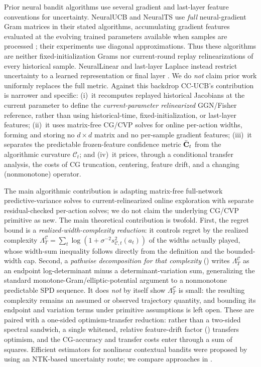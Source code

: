 \documentclass[twoside]{article}
\newcommand{\Calg}{\mathcal{C}}                 %
\newcommand{\Lamalg}{\Lambda^{\Calg}}           %
\begin{document}
Prior neural bandit algorithms use several gradient and last-layer feature
conventions for uncertainty.
NeuralUCB and NeuralTS use \emph{full} neural-gradient Gram matrices in their
stated algorithms, accumulating gradient features evaluated at the evolving
trained parameters available when samples are processed
\citep{zhou2020neural,zhang2021neural}; their experiments use diagonal
approximations.  Thus these algorithms are neither fixed-initialization Grams
nor current-round replay relinearizations of every historical sample.
NeuralLinear and last-layer Laplace instead restrict uncertainty to a learned
representation or final layer \citep{riquelme2018deep,kristiadi2020being}.
We do \emph{not} claim prior work uniformly replaces the full metric.
Against this backdrop CC-UCB's contribution is narrower and specific:
(i)~it recomputes replayed historical Jacobians at the current parameter to
define the \emph{current-parameter relinearized} GGN/Fisher reference, rather
than using historical-time, fixed-initialization, or last-layer features;
(ii)~it uses matrix-free CG/CVP solves for online per-action widths, forming and
storing no $d\times d$ matrix and no per-sample gradient features; (iii)~it
separates the predictable frozen-feature confidence
metric $\bar{\mathbf{C}}_t$ from the algorithmic curvature $\Calg_t$; and (iv)~it prices,
through a conditional transfer analysis, the costs of CG truncation, centering,
feature drift, and a changing (nonmonotone) operator.

The main algorithmic contribution is adapting matrix-free full-network
predictive-variance solves \citep{maddox2021fast} to current-relinearized online
exploration with separate residual-checked per-action solves; we do not claim
the underlying CG/CVP primitive as new.
The main theoretical contribution is twofold.  First, the regret bound is a
\emph{realized-width-complexity reduction}: it controls regret by the realized
complexity $\Lamalg_T=\sum_t\log(1+\sigma^{-2}s_{\Calg,t}^2(a_t))$ of the widths
actually played, whose width-sum inequality follows directly from the definition
and the bounded-width cap.  Second, a \emph{pathwise decomposition for that
complexity} () writes $\Lamalg_T$ as an endpoint
log-determinant minus a determinant-variation sum, generalizing the standard
monotone-Gram/elliptic-potential argument to a nonmonotone predictable SPD
sequence.  It does \emph{not} by itself show $\Lamalg_T$ is small: the resulting
complexity remains an assumed or observed trajectory quantity, and bounding its
endpoint and variation terms under primitive assumptions is left open.  These are
paired with a one-sided optimism-transfer reduction: rather than a two-sided
spectral sandwich, a single whitened, relative feature-drift factor
() transfers optimism, and the CG-accuracy and transfer costs
enter through a sum of squares.
Efficient estimators for nonlinear contextual bandits were proposed
by~\citet{kassraie2022neural} using an NTK-based uncertainty route;
we compare approaches in .
\end{document}
